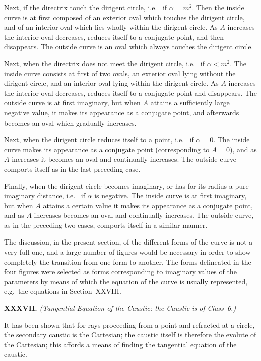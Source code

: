 \documentclass[12pt,a4paper]{article}
\theoremstyle{definition}
\newcommand{\ie}{i.e.\ }
\begin{document}
Next, if the directrix touch the dirigent circle, \ie{} if $\alpha = m^{2}$.
Then the inside curve is at first composed of an exterior oval
which touches the dirigent circle, and of an interior oval
which lies wholly within the dirigent circle. As $A$ increases
the interior oval decreases, reduces itself to a conjugate point,
and then disappears. The outside curve is an oval which always
touches the dirigent circle.

Next, when the directrix does not meet the dirigent circle,
\ie{} if $\alpha < m^{2}$. The inside curve consists at first of two ovals,
an exterior oval lying without the dirigent circle, and an interior
oval lying within the dirigent circle. As $A$ increases the interior
oval decreases, reduces itself to a conjugate point and disappears.
The outside curve is at first imaginary, but when $A$ attains a
sufficiently large negative value, it makes its appearance as a
conjugate point, and afterwards becomes an oval which gradually
increases.

Next, when the dirigent circle reduces itself to a point,
\ie{} if $\alpha = 0$. The inside curve makes its appearance as a
conjugate point (corresponding to $A = 0$), and as $A$ increases
it becomes an oval and continually increases. The outside curve
comports itself as in the last preceding case.

Finally, when the dirigent circle becomes imaginary, or has
for its radius a pure imaginary distance, \ie{} if $\alpha$ is negative.
The inside curve is at first imaginary, but when $A$ attains a
certain value it makes its appearance as a conjugate point,
and as $A$ increases becomes an oval and continually increases.
The outside curve, as in the preceding two cases, comports
itself in a similar manner.

The discussion, in the present section, of the different forms
of the curve is not a very full one, and a large number of
figures would be necessary in order to show completely the
transition from one form to another. The forms delineated in
the four figures were selected as forms corresponding to imaginary
values of the parameters by means of which the equation of the
curve is usually represented, e.g.\ the equations in Section~XXVIII.

\medskip\noindent\textbf{XXXVII.}
\textit{(Tangential Equation of the Caustic: the Caustic is of Class~6.)}

It has been shown that for rays proceeding from a point
and refracted at a circle, the secondary caustic is the Cartesian;
the caustic itself is therefore the evolute of the Cartesian;
this affords a means of finding the tangential equation of the caustic.
\end{document}
